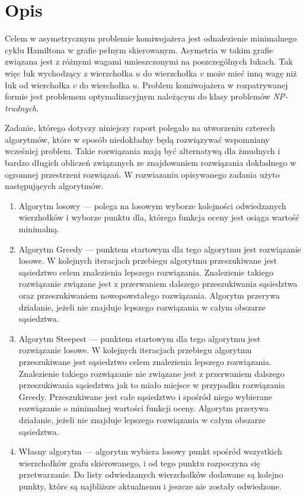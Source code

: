 \section{Opis}

Celem w asymetrycznym problemie komiwojażera jest odnalezienie
minimalnego cyklu Hamiltona w grafie pełnym skierowanym.
Asymetria w takim grafie związana jest z różnymi wagami
umieszczonymi na poszczególnych łukach. Tak więc łuk wychodzący z wierzchołka
$u$ do wierzchołka $v$ może mieć inną wagę niż łuk
od wierchołka $v$ do wierchołka $u$. Problem komiwojażera w rozpatrywanej
formie jest problemem optymalizacyjnym należącym do klasy problemów
\emph{NP-trudnych}.

Zadanie, którego dotyczy niniejszy raport polegało na utworzeniu czterech
algorytmów, które w sposób niedokładny będą rozwiązywać wspomniany
wcześniej problem. Takie rozwiązania mają być alternatywą dla żmudnych
i bardzo długich obliczeń związanych ze znajdowaniem rozwiązania
dokładnego w ogromnej przestrzeni rozwiązań.
W rozwiazaniu opisywanego zadania użyto następujących algorytmów.

\begin{enumerate}

\item Algorytm losowy --- polega na losowym wyborze kolejności
odwiedzanych wierzhołków i wyborze punktu dla, którego funkcja
oceny jest osiąga wartość minimalną.

\item Algorytm Greedy --- punktem startowym dla tego algorytmu jest
rozwiązanie losowe. W kolejnych iteracjach przebiegu algorytmu przeszukiwane
jest sąsiedztwo celem znalezienia lepszego rozwiązania. Znalezienie takiego
rozwiązanie związane jest z przerwaniem dalszego przeszukiwania sąsiedztwa
oraz przeszukiwaniem nowopowstałego rozwiązania.
Algorytm przerywa działanie, jeżeli nie znajduje lepszego rozwiązania w
całym obszarze sąsiedztwa.

\item Algorytm Steepest --- punktem startowym dla tego algorytmu jest
rozwiązanie losowe. W kolejnych iteracjach przebiegu algorytmu przeszukiwane
jest sąsiedztwo celem znalezienia lepszego rozwiązania. Znalezienie takiego
rozwiązanie nie związane jest z przerwaniem dalszego przeszukiwania sąsiedztwa
jak to miało miejsce w przypadku rozwiązania Greedy. Przeszukiwane jest
całe sąsiedztwo i spośród niego wybierane rozwiązanie o minimalnej wartości
funkcji oceny.
Algorytm przerywa działanie, jeżeli nie znajduje lepszego rozwiązania w
całym obszarze sąsiedztwa.

\item Własny algorytm --- algorytm wybiera losowy punkt spośród wszystkich
wierzchołków grafu skierowanego, i od tego punktu rozpoczyna się
przetwarzanie. Do listy odwiedzanych wierzchołków dodawane są kolejno
punkty, które są najbliższe aktualnemu i jeszcze nie zostały odwiedzone.

\end{enumerate}

